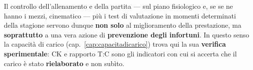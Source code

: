 Il controllo dell'allenamento e della partita --- sul piano fisiologico e, se se ne hanno i mezzi,
cinematico --- più i test di valutazione in momenti determinati della stagione servono dunque
\textbf{non solo} al miglioramento della prestazione, ma \textbf{soprattutto} a una vera azione di
\textbf{prevenzione degli infortuni}. In questo senso la capacità di carico
(cap.~\ref{cap:capacitadicarico}) trova qui la sua \textbf{verifica sperimentale}: CK e rapporto
T:C sono gli indicatori con cui si accerta che il carico è stato \textbf{rielaborato} e non subìto.
